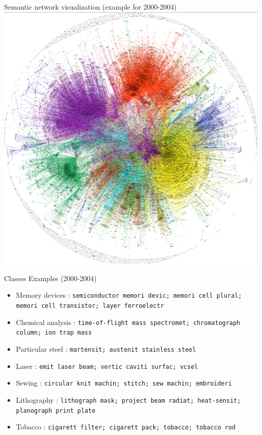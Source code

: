 \documentclass{beamer}
\begin{document}
\begin{frame}{Semantic network visualization (example for 2000-2004)}
   \centering
    \includegraphics[height=0.85\textheight]{figures/Fig2.png}
    
\end{frame}


\begin{frame}{Classes Examples (2000-2004)}


\begin{itemize}
\item Memory devices : \texttt{semiconductor memori devic; memori cell plural; memori cell transistor; layer ferroelectr}
\item Chemical analysis : \texttt{time-of-flight mass spectromet; chromatograph column; ion trap mass}
\item Particular steel : \texttt{martensit; austenit stainless steel}
\item Laser : \texttt{emit laser beam; vertic caviti surfac; vcsel}
\item Sewing : \texttt{circular knit machin; stitch; sew machin; embroideri}
\item Lithography : \texttt{lithograph mask; project beam radiat; heat-sensit; planograph print plate}
\item Tobacco : \texttt{cigarett filter; cigarett pack; tobacco; tobacco rod}
\end{itemize}
 \end{frame}
\end{document}
